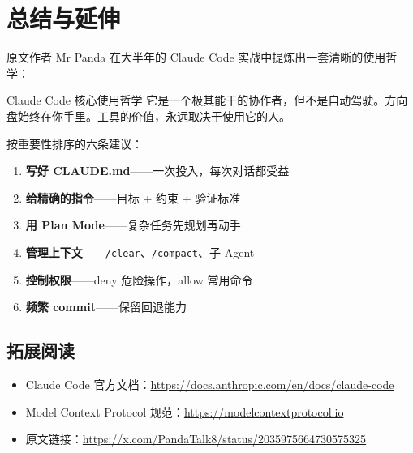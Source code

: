 \section{总结与延伸}

原文作者 Mr Panda 在大半年的 Claude Code 实战中提炼出一套清晰的使用哲学：

\begin{importantbox}{Claude Code 核心使用哲学}
它是一个极其能干的协作者，但不是自动驾驶。方向盘始终在你手里。工具的价值，永远取决于使用它的人。
\end{importantbox}

按重要性排序的六条建议：

\begin{enumerate}[leftmargin=1.5em]
  \item \textbf{写好 CLAUDE.md}——一次投入，每次对话都受益
  \item \textbf{给精确的指令}——目标 + 约束 + 验证标准
  \item \textbf{用 Plan Mode}——复杂任务先规划再动手
  \item \textbf{管理上下文}——\texttt{/clear}、\texttt{/compact}、子 Agent
  \item \textbf{控制权限}——deny 危险操作，allow 常用命令
  \item \textbf{频繁 commit}——保留回退能力
\end{enumerate}

\subsection{拓展阅读}

\begin{itemize}[leftmargin=1.5em]
  \item Claude Code 官方文档：\url{https://docs.anthropic.com/en/docs/claude-code}
  \item Model Context Protocol 规范：\url{https://modelcontextprotocol.io}
  \item 原文链接：\url{https://x.com/PandaTalk8/status/2035975664730575325}
\end{itemize}


